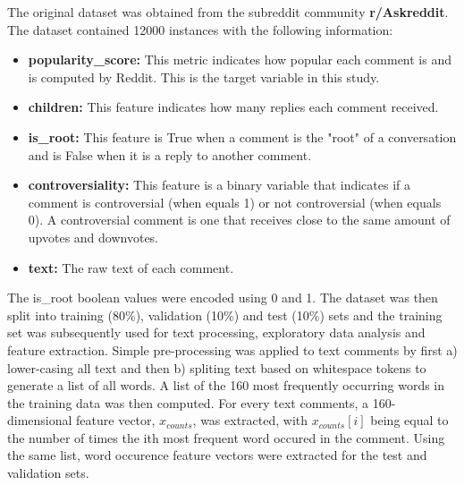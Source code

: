 \documentclass[11pt]{article}
\begin{document}
The original dataset was obtained from the subreddit community \textbf{r/Askreddit}. The dataset contained 12000 instances  with the following information:

\begin{itemize}
    	\item \textbf{popularity\_score:} This metric indicates how popular each comment is and is computed by Reddit. This is the target variable in this study. 
   	\item \textbf{children:} This feature indicates how many replies each comment received.
    	\item \textbf{is\_root:} This feature is True when a comment is the "root" of a conversation and is False when it is a reply to another comment.
    	\item \textbf{controversiality:} This feature is a binary variable that indicates if a comment is controversial (when equals 1) or not controversial (when equals 0). A controversial comment is one that receives close to the same amount of upvotes and downvotes.
    	\item \textbf{text:} The raw text of each comment.
\end{itemize}

The is\_root boolean values were encoded using 0 and 1.  The dataset was then split into training (80\%), validation (10\%) and test (10\%) sets and the training set was subsequently used for text processing, exploratory data analysis and feature extraction. Simple pre-processing was applied to text comments by first a) lower-casing all text and then b) spliting text based on whitespace tokens to generate a list of all words. A list of the 160 most frequently occurring words in the training data was then computed. For every text comments, a 160-dimensional feature vector, $x_{counts}$, was extracted, with $x_{counts}[i]$ being equal to the number of times the ith most frequent word occured in the comment. Using the same list, word occurence feature vectors were extracted for the test and validation sets. 
\\
\end{document}
